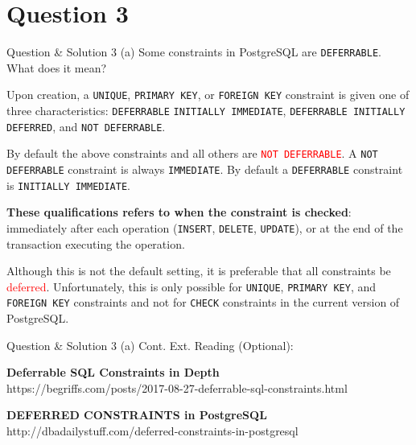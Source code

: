 \section*{Question 3}

\begin{frame}[fragile]{Question \& Solution 3 (a)}
Some constraints in PostgreSQL are \texttt{DEFERRABLE}. What does it mean? \vspace{10pt}

Upon creation, a \texttt{UNIQUE}, \texttt{PRIMARY KEY}, or \texttt{FOREIGN KEY} constraint is given one of three characteristics: \texttt{DEFERRABLE} \texttt{INITIALLY IMMEDIATE}, \texttt{DEFERRABLE INITIALLY DEFERRED}, and \texttt{NOT DEFERRABLE}.  \vspace{10pt}

By default the above constraints and all others are \textcolor{red}{\texttt{NOT DEFERRABLE}}. A \texttt{NOT DEFERRABLE} constraint is always \texttt{IMMEDIATE}. By default a \texttt{DEFERRABLE} constraint is \texttt{INITIALLY IMMEDIATE}. \vspace{10pt}

\textbf{These qualifications refers to when the constraint is checked}: immediately after each operation (\texttt{INSERT}, \texttt{DELETE}, \texttt{UPDATE}), or at the end of the transaction executing the operation. \vspace{10pt}

Although this is not the default setting, it is preferable that all constraints be \textcolor{red}{deferred}. Unfortunately, this is only possible for \texttt{UNIQUE}, \texttt{PRIMARY KEY}, and \texttt{FOREIGN KEY} constraints and not for \texttt{CHECK} constraints in the current version of PostgreSQL.
\end{frame}

\begin{frame}[fragile]{Question \& Solution 3 (a) Cont.}
Ext. Reading (Optional):\\\vspace{20pt}

\textbf{Deferrable SQL Constraints in Depth}\\
https://begriffs.com/posts/2017-08-27-deferrable-sql-constraints.html\vspace{10pt}

\textbf{DEFERRED CONSTRAINTS in PostgreSQL}\\
http://dbadailystuff.com/deferred-constraints-in-postgresql
\end{frame}

